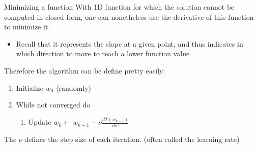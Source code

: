 \begin{parag}{Minimizing a function}
    With 1D function for which the solution cannot be computed in closed form, one can nonetheless use the derivative of this function to minimize it.
	\begin{itemize}
		\item Recall that it represents the slope at a given point, and thus indicates in which direction to move to reach a lower function value
	\end{itemize}
	Therefore the algorithm can be define pretty easily:
	\begin{enumerate}
	    \item Initialize $w_0$ (randomly)
	    \item While not converged do 
			\begin{enumerate}
			    \item Update $w_k \leftarrow w_{k-1} - \nu \frac{d T\left(w_{k-1}\right)}{dw}$
			\end{enumerate}
	\end{enumerate}
	The $\nu$ defines the step size of each iteration. (often called the learning rate)
\end{parag}
